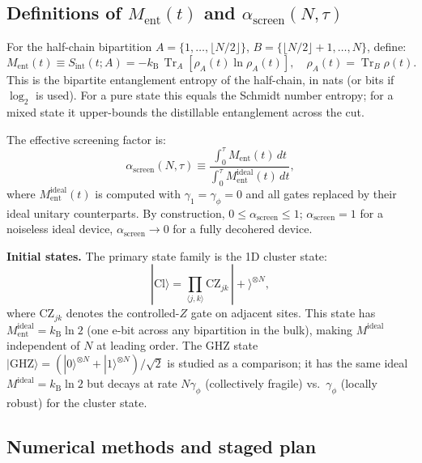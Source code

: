 \documentclass[12pt,letterpaper]{article}
\theoremstyle{plain}
\theoremstyle{definition}
\newcommand{\kB}{k_{\mathrm{B}}}
\newcommand{\asc}{\alpha_{\mathrm{screen}}}
\newcommand{\sint}{S_{\mathrm{int}}}
\newcommand{\tr}{\operatorname{Tr}}
\begin{document}
\subsection{Definitions of $M_{\mathrm{ent}}(t)$ and $\asc(N,\tau)$}

For the half-chain bipartition $A = \{1,\ldots,\lfloor N/2\rfloor\}$, $B = \{\lfloor N/2\rfloor+1,\ldots,N\}$, define:
\begin{equation}
  M_{\mathrm{ent}}(t)
  \equiv \sint(t; A)
  = -\kB\,\tr_A\!\left[\rho_A(t)\ln\rho_A(t)\right],
  \quad
  \rho_A(t) = \tr_B\rho(t).
  \label{eq:Ment-def}
\end{equation}
This is the bipartite entanglement entropy of the half-chain, in nats (or bits if $\log_2$ is used).  For a pure state this equals the Schmidt number entropy; for a mixed state it upper-bounds the distillable entanglement across the cut.

The effective screening factor is:
\begin{equation}
  \asc(N,\tau)
  \equiv
  \frac{\int_0^\tau M_{\mathrm{ent}}(t)\,dt}{\int_0^\tau M^{\mathrm{ideal}}_{\mathrm{ent}}(t)\,dt},
  \label{eq:asc-def}
\end{equation}
where $M^{\mathrm{ideal}}_{\mathrm{ent}}(t)$ is computed with $\gamma_1 = \gamma_\phi = 0$ and all gates replaced by their ideal unitary counterparts.  By construction, $0 \leq \asc \leq 1$; $\asc = 1$ for a noiseless ideal device, $\asc \to 0$ for a fully decohered device.

\textbf{Initial states.}  The primary state family is the 1D cluster state:
\begin{equation}
  |\mathrm{Cl}\rangle
  = \prod_{\langle j,k\rangle}\mathrm{CZ}_{jk}\,|{+}\rangle^{\otimes N},
  \label{eq:cluster}
\end{equation}
where $\mathrm{CZ}_{jk}$ denotes the controlled-$Z$ gate on adjacent sites.  This state has $M^{\mathrm{ideal}}_{\mathrm{ent}} = \kB\ln 2$ (one e-bit across any bipartition in the bulk), making $M^{\mathrm{ideal}}$ independent of $N$ at leading order.  The GHZ state $|\mathrm{GHZ}\rangle = (|0\rangle^{\otimes N}+|1\rangle^{\otimes N})/\sqrt{2}$ is studied as a comparison; it has the same ideal $M^{\mathrm{ideal}} = \kB\ln 2$ but decays at rate $N\gamma_\phi$ (collectively fragile) vs.\ $\gamma_\phi$ (locally robust) for the cluster state.

\subsection{Numerical methods and staged plan}
\end{document}
